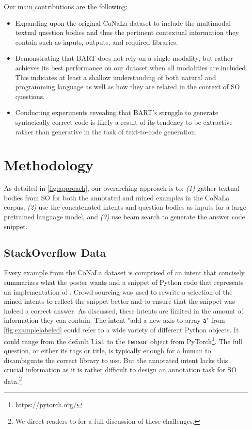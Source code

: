 \documentclass[11pt]{article}
\newcommand{\codesnip}[1]{\small\texttt{#1}\normalsize}
\begin{document}
\indent Our main contributions are the following:
\begin{itemize}
    \item Expanding upon the original CoNaLa dataset \citep{yin2018learning} to include the multimodal textual question bodies and thus the pertinent contextual information they contain such as inputs, outputs, and required libraries.  
    \item Demonstrating that BART does not rely on a single modality, but rather achieves its best performance on our dataset when all modalities are included. This indicates at least a shallow understanding of both natural and programming language as well as how they are related in the context of SO questions.
    \item Conducting experiments revealing that BART's struggle to generate syntacically correct code is likely a result of its tendency to be extractive rather than generative in the task of text-to-code generation.
\end{itemize}

\section{Methodology}
As detailed in \autoref{fig:approach}, our overarching approach is to: \textit{(1)} gather textual bodies from SO for both the annotated and mined examples in the CoNaLa corpus, \textit{(2)} use the concatenated intents and question bodies as inputs for a large pretrained language model, and \textit{(3)} use beam search to generate the answer code snippet.        

\subsection{StackOverflow Data}\label{subsec:sodata}
Every example  from the CoNaLa dataset \citep{yin2018learning} is comprised of an intent  that concisely summarizes what the poster wants and a snippet of Python code  that represents an implementation of . Crowd sourcing was used to rewrite a selection of the mined intents to reflect the snippet better and to ensure that the snippet was indeed a correct answer. As discussed, these intents are limited in the amount of information they can contain. The intent "add a new axis to array \codesnip{a}" from \autoref{fig:examplelabeled} could refer to a wide variety of different Python objects. It could range from the default \codesnip{list} to the \codesnip{Tensor} object from PyTorch\footnote{https://pytorch.org/}. The full question, or either its tags or title, is typically enough for a human to disambiguate the correct library to use. But the annotated intent lacks this crucial information as it is rather difficult to design an annotation task for SO data.\footnote{We direct readers to \citet{yin2018learning} for a full discussion of these challenges.} 
\end{document}
